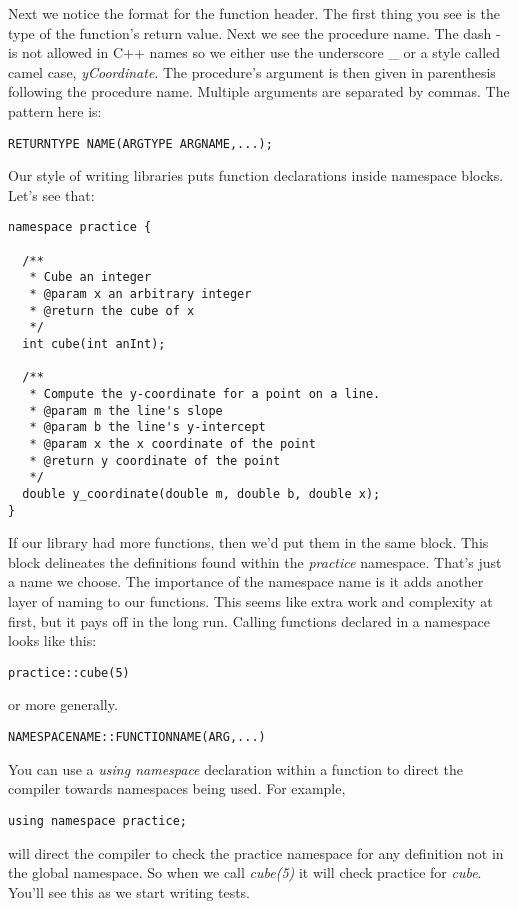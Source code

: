 \documentclass[]{tufte-handout}
\begin{document}
Next we notice the format for the function header. The first thing you see is the type of the function's return value.  Next we see the procedure name. The dash - is not allowed in C++ names so we either use the underscore \_ or a style called camel case, \textit{yCoordinate}. The procedure's argument is then given in parenthesis following the procedure name. Multiple arguments are separated by commas. The pattern here is:
\begin{verbatim}
RETURNTYPE NAME(ARGTYPE ARGNAME,...);
\end{verbatim} 


Our style of writing libraries puts function declarations inside namespace blocks. Let's see that:
\begin{verbatim}
namespace practice {

  /**
   * Cube an integer
   * @param x an arbitrary integer
   * @return the cube of x
   */
  int cube(int anInt);

  /**
   * Compute the y-coordinate for a point on a line.
   * @param m the line's slope
   * @param b the line's y-intercept
   * @param x the x coordinate of the point
   * @return y coordinate of the point 
   */
  double y_coordinate(double m, double b, double x);
}
\end{verbatim}

If our library had more functions, then we'd put them in the same block. This block delineates the definitions found within the \textit{practice} namespace.  That's just a name we choose.  The importance of the namespace name is it adds another layer of naming to our functions. This seems like extra work and complexity at first, but it pays off in the long run. Calling functions declared in a namespace looks like this:
\begin{verbatim}
practice::cube(5)
\end{verbatim}
or more generally.
\begin{verbatim}
NAMESPACENAME::FUNCTIONNAME(ARG,...)
\end{verbatim}

You can use a \textit{using namespace} declaration within a function to direct the compiler towards namespaces being used. For example,
\begin{verbatim}
using namespace practice;
\end{verbatim}
will direct the compiler to check the practice namespace for any definition not in the global namespace. So when we call \textit{cube(5)} it will check practice for \textit{cube}. You'll see this as we start writing tests.
\end{document}
